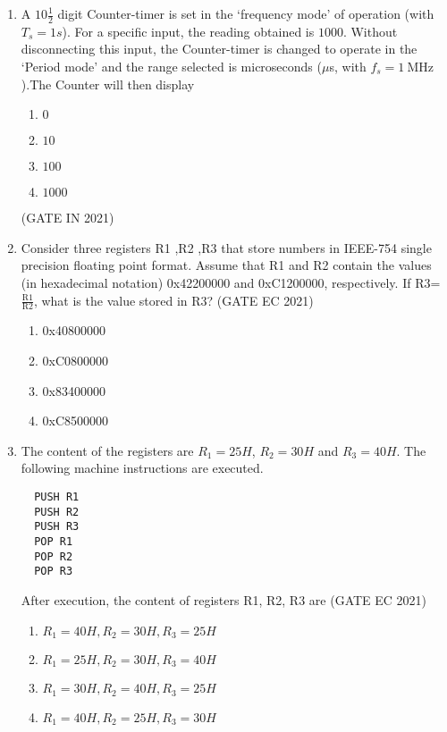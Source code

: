 \begin{enumerate}[label=\arabic*.,ref=\theenumi]
\begin{lstlisting}
LOOP: DCR B ; Decrement register B. Affects Flags. Takes 4 clock periods. 
JNZ LOOP ; Jump to address with Label LOOP if zero flag is not set. Takes 10 clock periods when jump is performed and 7 clock periods when jump is not performed.
\end{lstlisting}
%
\item A $10\frac{1}{2}$ digit Counter-timer is set in the `frequency mode' of operation (with $T_s=1s$). For a specific input, the reading obtained is $1000$. Without disconnecting this input, the Counter-timer is changed to operate in the `Period mode' and the range selected is microseconds ($\mu$s, with $f_s=\SI{1}{\mega\hertz}$).The Counter will then display
\begin{multicols}{4}
\begin{enumerate}
  \item $0$
  \item $10$
  \item $100$
  \item $1000$
\end{enumerate}
\end{multicols}
\hfill(GATE IN 2021)

\item Consider three registers R1 ,R2 ,R3 that store numbers in  IEEE-754  single precision floating point format. Assume that R1 and R2 contain the values (in hexadecimal notation) 0x42200000 and 0xC1200000, respectively. If  R3=$\frac{\text{R1}}{\text{R2}}$, what is the value stored in R3?
\hfill(GATE EC 2021)
\begin{multicols}{2}
\begin{enumerate}
    \item 0x40800000
    \item 0xC0800000
    \item 0x83400000
    \item 0xC8500000
\end{enumerate}
\end{multicols}
%
\item The content of the registers are $R_1 = 25H$, $R_2 = 30H$ and $R_3 = 40H$. The following machine instructions are executed.
	\begin{lstlisting}
  PUSH R1  
  PUSH R2
  PUSH R3 
  POP R1 
  POP R2 
  POP R3 
\end{lstlisting}
%
After execution, the content of registers R1, R2, R3 are
\hfill(GATE EC 2021)
%
\begin{multicols}{2}
\begin{enumerate}
    \item $R_1 = 40H, R_2 = 30H,R_3 = 25H$
    \item $R_1 = 25H, R_2 = 30H,R_3 = 40H$
    \item $R_1 = 30H, R_2 = 40H,R_3 = 25H$
    \item $R_1 = 40H, R_2 = 25H,R_3 = 30H$
\end{enumerate}
\end{multicols}
\end{enumerate}
